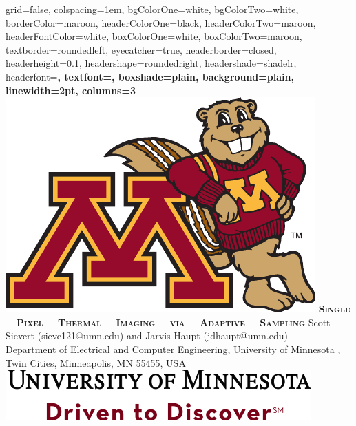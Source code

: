 \documentclass[landscape,final,a0paper,fontscale=0.33]{baposter}
\begin{document}

\newcommand{\SSfontsize}{}
\begin{poster}%
  {
  grid=false,
  colspacing=1em,
  bgColorOne=white,
  bgColorTwo=white,
  borderColor=maroon,
  headerColorOne=black,
  headerColorTwo=maroon,
  headerFontColor=white,
  boxColorOne=white,
  boxColorTwo=maroon,
  textborder=roundedleft,
  eyecatcher=true,
  headerborder=closed,
  headerheight=0.1\textheight,
  headershape=roundedright,
  headershade=shadelr,
  headerfont=\large\bf\textsc, %
  textfont={\setlength{\parindent}{1.5em}},
  boxshade=plain,
  background=plain,
  linewidth=2pt,
  columns=3
  }
  {\includegraphics[scale = 0.5]{logo-eps-converted-to}}
  {\hspace{1.5em}\huge\bf\textsc{Single \ \ Pixel \ \ Thermal \ \ Imaging \ \ via \ \ Adaptive \ \ Sampling}\vspace{0.2em}}
  {\hspace{2em}Scott Sievert (sieve121@umn.edu) and Jarvis Haupt (jdhaupt@umn.edu) \\ \hspace{2em}\large{Department of Electrical and Computer Engineering, University of Minnesota , Twin Cities, Minneapolis, MN 55455, USA}}
 {%
     \hspace{-0.1em}\includegraphics[scale = 0.4]{wordmark}
  }


\end{poster}
\end{document}
